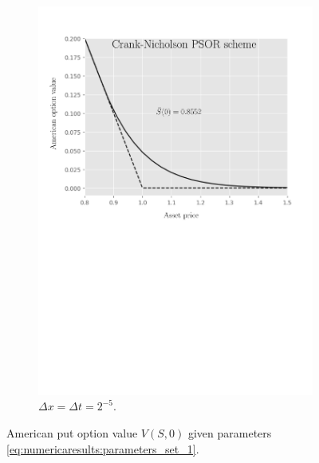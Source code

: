 \begin{figure}[H]
\begin{subfigure}{0.4\textwidth}
    \includegraphics[width=\textwidth]{chapters/chapter5/TestCase2CrankNicholsonLCP.pdf}
    \caption{$\Delta{x}=\Delta{t}=2^{-5}$.}
  \end{subfigure}
  \caption{American put option value $V(S, 0)$ given parameters \eqref{eq:numericaresults:parameters_set_1}.}
  \label{fig:lcp:numericaresults:test_case_2}
\end{figure}

